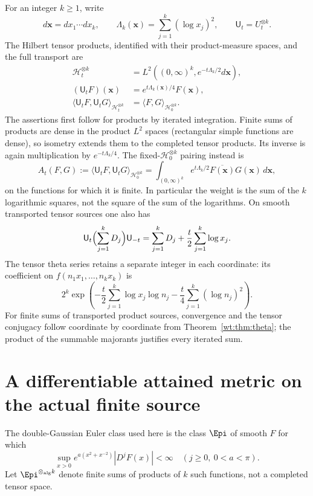 For an integer $k\geq1$, write
\[
 d\mathbf x=dx_1\cdots dx_k,\qquad
 \Lambda_k(\mathbf x)=\sum_{j=1}^k(\log x_j)^2,\qquad
 \mathsf U_t=U_t^{\otimes k}.
\]
The Hilbert tensor products, identified with their product-measure
spaces, and the full transport are
\begin{equation}\label{wt:eq:tensor}
 \begin{split}
 \mathcal H_t^{\otimes k}
 &=L^2((0,\infty)^k,e^{-t\Lambda_k/2}d\mathbf x),\\
 (\mathsf U_tF)(\mathbf x)&=e^{t\Lambda_k(\mathbf x)/4}F(\mathbf x),\\
 \langle\mathsf U_tF,\mathsf U_tG\rangle_{\mathcal H_t^{\otimes k}}
 &=\langle F,G\rangle_{\mathcal H_0^{\otimes k}}.
 \end{split}
\end{equation}
The assertions first follow for products by iterated integration.
Finite sums of products are dense in the product $L^2$ spaces
(rectangular simple functions are dense), so isometry extends
them to the completed tensor products.  Its inverse is again
multiplication by $e^{-t\Lambda_k/4}$.
The fixed-$\mathcal H_0^{\otimes k}$ pairing instead is
\begin{equation}\label{wt:eq:fixed-form}
 A_t(F,G):=\langle\mathsf U_tF,\mathsf U_tG\rangle_{\mathcal H_0^{\otimes k}}
 =\int_{(0,\infty)^k}e^{t\Lambda_k/2}\overline{F(\mathbf x)}
 G(\mathbf x)\,d\mathbf x,
\end{equation}
on the functions for which it is finite.  In particular the
weight is the sum of the $k$ logarithmic squares, not the square
of the sum of the logarithms.
On smooth transported tensor sources one also has
\[
 \mathsf U_t\Bigl(\sum_{j=1}^kD_j\Bigr)\mathsf U_{-t}
 =\sum_{j=1}^kD_j+\frac t2\sum_{j=1}^k\log x_j.
\]
The tensor theta series retains a separate integer in each
coordinate: its coefficient on $f(n_1x_1,\ldots,n_kx_k)$ is
\[
 2^k\exp\!\left(-\frac t2\sum_{j=1}^k\log x_j\log n_j
                 -\frac t4\sum_{j=1}^k(\log n_j)^2\right).
\]
For finite sums of transported product sources, convergence and
the tensor conjugacy follow coordinate by coordinate from
Theorem~\ref{wt:thm:theta}; the product of the summable majorants
justifies every iterated sum.

\section{A differentiable attained metric on the actual finite source}
\label{wt:sec:metric}

The double-Gaussian Euler class used here is the class $\Epi$
of smooth $F$ for which
\begin{equation}\label{wt:eq:class}
 \sup_{x>0}e^{a(x^2+x^{-2})}|D^jF(x)|<\infty
 \quad(j\geq0,\ 0<a<\pi).
\end{equation}
Let $\Epi^{\otimes_{\mathrm{alg}} k}$ denote finite sums of
products of $k$ such functions, not a completed tensor space.


